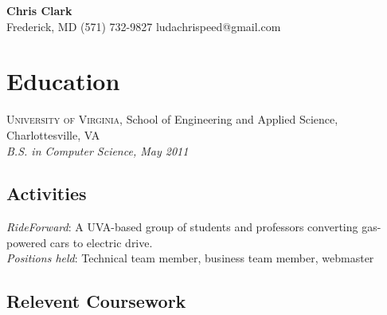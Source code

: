 \documentclass[a4paper,11pt]{article}
\begin{document}
\begin{center}
  {\sffamily \huge \textbf{Chris Clark}} \\ 
  Frederick, MD \enspace\textopenbullet\enspace 
  (571) 732-9827 \enspace\textopenbullet\enspace 
  ludachrispeed@gmail.com
\end{center}


\vspace{-8pt}
\section*{Education}

  \textsc{University of Virginia}, School of Engineering and Applied Science,
  Charlottesville, VA \\
  \textit{B.S. in Computer Science, May 2011}

  \subsection*{Activities}

  \textit{RideForward}: A UVA-based group of students and professors converting
  gas-powered cars to electric drive. \\
  \textit{Positions held}: Technical team member, business team member, webmaster

  \subsection*{Relevent Coursework}
\end{document}
